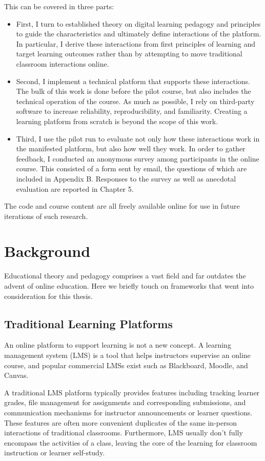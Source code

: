 \documentclass[12pt,twoside,vi]{mitthesis}
\begin{document}
This can be covered in three parts:
\begin{itemize}
	\item First, I turn to established theory on digital learning pedagogy and principles to guide the characteristics and ultimately define interactions of the platform. In particular, I derive these interactions from first principles of learning and target learning outcomes rather than by attempting to move traditional classroom interactions online.
	\item Second, I implement a technical platform that supports these interactions. The bulk of this work is done before the pilot course, but also includes the technical operation of the course. As much as possible, I rely on third-party software to increase reliability, reproducibility, and familiarity. Creating a learning platform from scratch is beyond the scope of this work.
	\item Third, I use the pilot run to evaluate not only how these interactions work in the manifested platform, but also how well they work. In order to gather feedback, I conducted an anonymous survey among participants in the online course. This consisted of a form sent by email, the questions of which are included in Appendix B. Responses to the survey as well as anecdotal evaluation are reported in Chapter 5.
\end{itemize}

The code and course content are all freely available online for use in future iterations of such research.~\cite{rla}

\chapter{Background}

Educational theory and pedagogy comprises a vast field and far outdates the advent of online education. Here we briefly touch on frameworks that went into consideration for this thesis. 

\section{Traditional Learning Platforms}

An online platform to support learning is not a new concept. A learning management system (LMS) is a tool that helps instructors supervise an online course, and popular commercial LMSs exist such as Blackboard, Moodle, and Canvas. 

A traditional LMS platform typically provides features including tracking learner grades, file management for assignments and corresponding submissions, and communication mechanisms for instructor announcements or learner questions. These features are often more convenient duplicates of the same in-person interactions of traditional classrooms. Furthermore, LMS usually don't fully encompass the activities of a class, leaving the core of the learning for classroom instruction or learner self-study.~\cite{zagalsky2015emergence}
\end{document}
